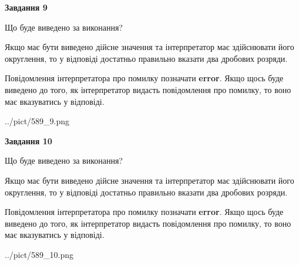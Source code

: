 \documentclass[12pt, ukrainian]{article}
\begin{document}
{\begin {Large}
{\begin {center}\textbf{Завдання 9}\end {center}}\par
Що буде виведено за виконання? \par

Якщо має бути виведено дійсне значення та інтерпретатор має здійснювати його округлення, 
то у відповіді достатньо правильно вказати два дробових розряди.

Повідомлення інтерпретатора про помилку позначати \textbf{error}.
Якщо щось буде виведено до того, як інтерпретатор видасть повідомлення про помилку, 
то воно має вказуватись у відповіді. \par

\begin{center}
	{../pict/589_9.png}
\end{center}
\newpage

{\begin {center}\textbf{Завдання 10}\end {center}}\par
Що буде виведено за виконання? \par

Якщо має бути виведено дійсне значення та інтерпретатор має здійснювати його округлення, 
то у відповіді достатньо правильно вказати два дробових розряди.

Повідомлення інтерпретатора про помилку позначати \textbf{error}.
Якщо щось буде виведено до того, як інтерпретатор видасть повідомлення про помилку, 
то воно має вказуватись у відповіді. \par

\begin{center}
	{../pict/589_10.png}
\end{center}
\newpage

\end {Large}}
\end{document}
